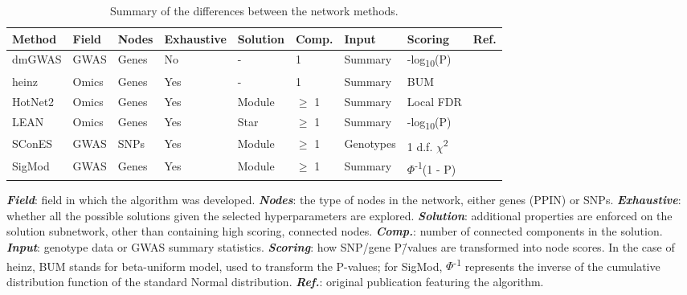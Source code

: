 \documentclass[10pt,letterpaper]{article}
\begin{document}
\begin{table}[htbp]
  \caption{Summary of the differences between the network methods.}
  \label{tab:method_comparison}
  \centering
  \begin{threeparttable}
    \begin{tabular}{l|llllllll}
      Method & Field & Nodes & Exhaustive & Solution & Comp. & Input & Scoring & Ref.\\
      \hline
      dmGWAS & GWAS & Genes & No & - & 1 & Summary & -log\textsubscript{10}(P) & \cite{jia_dmgwas:_2011}\\
      heinz & Omics & Genes & Yes & - & 1 & Summary & BUM & \cite{dittrich_identifying_2008}\\
      HotNet2 & Omics & Genes & Yes & Module & \(\ge\) 1 & Summary & Local FDR & \cite{leiserson_pan-cancer_2015}\\
      LEAN & Omics & Genes & Yes & Star & \(\ge\) 1 & Summary & -log\textsubscript{10}(P) & \cite{gwinner_network-based_2016}\\
      SConES & GWAS & SNPs & Yes & Module & \(\ge\) 1 & Genotypes & 1 d.f. \(\chi\)\textsuperscript{2} & \cite{azencott_efficient_2013}\\
      SigMod & GWAS & Genes & Yes & Module & \(\ge\) 1 & Summary & $\Phi$\textsuperscript{-1}(1 - P) & \cite{liu_sigmod:_2017}\\
    \end{tabular}
    \begin{tablenotes}
      \footnotesize{
        \item \textbf{\emph{Field}}: field in which the algorithm was developed. \textbf{\emph{Nodes}}: the type of nodes in the network, either genes (PPIN) or SNPs. \textbf{\emph{Exhaustive}}: whether all the possible solutions given the selected hyperparameters are explored. \textbf{\emph{Solution}}: additional properties are enforced on the solution subnetwork, other than containing high scoring, connected nodes. \textbf{\emph{Comp.}}: number of connected components in the solution. \textbf{\emph{Input}}: genotype data or GWAS summary statistics. \textbf{\emph{Scoring}}: how SNP/gene P\=/values are transformed into node scores. In the case of heinz, BUM stands for beta-uniform model, used to transform the P-values; for SigMod, $\Phi$\textsuperscript{-1} represents the inverse of the
        cumulative distribution function of the standard Normal distribution. \textbf{\emph{Ref.}}: original publication featuring the algorithm.
      }
    \end{tablenotes}
  \end{threeparttable}
\end{table}
\end{document}
